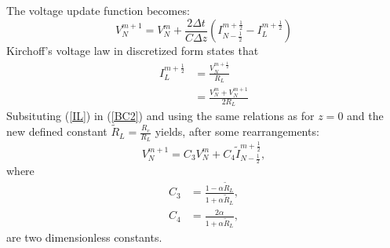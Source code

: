 \documentclass[dutch, a4paper, 11pt]{article}
\begin{document}
\begin{multicols}{2}
\begin{itemize}
    The voltage update function becomes:
    \begin{equation}
        V^{m+1}_{N} = V^{m}_{N} + \frac{2\Delta t}{C\Delta z}\left(I^{m+\frac{1}{2}}_{N-\frac{1}{2}} - I^{m+\frac{1}{2}}_{L}\right)
        \label{BC2}
    \end{equation}
    Kirchoff's voltage law in discretized form states that
    \begin{align}
        I^{m+\frac{1}{2}}_{L} & = \frac{V^{m+\frac{1}{2}}_{N}}{R_{L}}\\
        & = \frac{V^{m}_{N}+V^{m+1}_{N}}{2R_{L}}
        \label{IL}
    \end{align}
    Subsituting (\ref{IL}) in (\ref{BC2}) and using the same relations as for $z=0$ and the new defined constant $\tilde{R}_{L} = \frac{R_c}{R_L}$ yields, 
    after some rearrangements:
    \begin{equation}
        V^{m+1}_{N} = C_{3}V^{m}_N + C_{4}\tilde{I}^{m+\frac{1}{2}}_{N-\frac{1}{2}},
    \end{equation}
    where
    \begin{align}
        C_{3} & = \frac{1-\alpha\tilde{R}_{L}}{1+\alpha\tilde{R}_{L}},\\
        C_{4} & = \frac{2\alpha}{1+\alpha\tilde{R}_{L}},
    \end{align}
    are two dimensionless constants.
\end{itemize}

\end{multicols}
\end{document}
